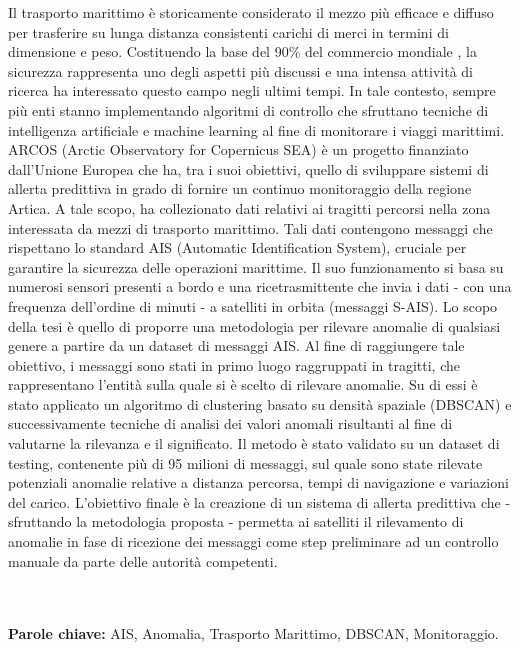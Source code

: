 \documentclass{Configuration_Files/PoliMi3i_thesis}
\begin{document}
Il trasporto marittimo è storicamente considerato il mezzo più efficace e diffuso per trasferire su lunga distanza consistenti carichi di merci in termini di dimensione e peso. Costituendo la base del 90\% del commercio mondiale \cite{trasporto_marittimo}, la sicurezza rappresenta uno degli aspetti più discussi e una intensa attività di ricerca ha interessato questo campo negli ultimi tempi.  
In tale contesto, sempre più enti stanno implementando algoritmi di controllo che sfruttano tecniche di intelligenza artificiale e machine learning al fine di monitorare i viaggi marittimi. ARCOS (Arctic Observatory for Copernicus SEA) è un progetto finanziato dall'Unione Europea che ha, tra i suoi obiettivi, quello di sviluppare sistemi di allerta predittiva in grado di fornire un continuo monitoraggio della regione Artica. A tale scopo, ha collezionato dati relativi ai tragitti percorsi nella zona interessata da mezzi di trasporto marittimo. Tali dati contengono messaggi che rispettano lo standard AIS (Automatic Identification System), cruciale per garantire la sicurezza delle operazioni marittime. Il suo funzionamento si basa su numerosi sensori presenti a bordo e una ricetrasmittente che invia i dati - con una frequenza dell’ordine di minuti - a satelliti in orbita (messaggi S-AIS). Lo scopo della tesi è quello di proporre una metodologia per rilevare anomalie di qualsiasi genere a partire da un dataset di messaggi AIS. Al fine di raggiungere tale obiettivo, i messaggi sono stati in primo luogo raggruppati in tragitti, che rappresentano l'entità sulla quale si è scelto di rilevare anomalie. Su di essi è stato applicato un algoritmo di clustering basato su densità spaziale (DBSCAN) e successivamente tecniche di analisi dei valori anomali risultanti al fine di valutarne la rilevanza e il significato. Il metodo è stato validato su un dataset di testing, contenente più di 95 milioni di messaggi, sul quale sono state rilevate potenziali anomalie relative a distanza percorsa, tempi di navigazione e variazioni del carico. L'obiettivo finale è la creazione di un sistema di allerta predittiva che - sfruttando la metodologia proposta - permetta ai satelliti il rilevamento di anomalie in fase di ricezione dei messaggi come step preliminare ad un controllo manuale da parte delle autorità competenti.

\\
\\
\textbf{Parole chiave:} AIS, Anomalia, Trasporto Marittimo, DBSCAN, Monitoraggio.

\end{document}
